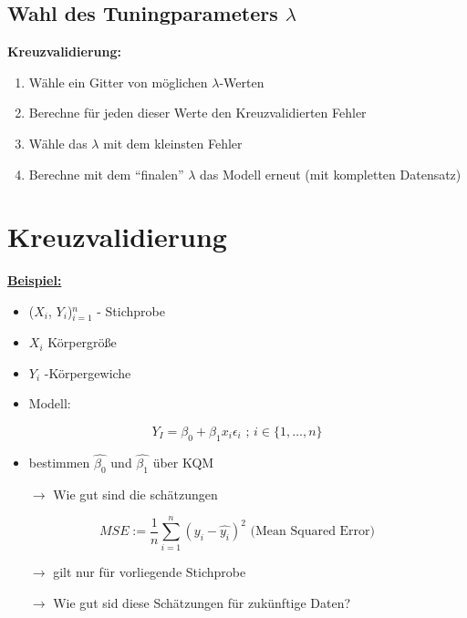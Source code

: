 
\subsection{Wahl des Tuningparameters $\lambda$}
\textbf{Kreuzvalidierung:}
\begin{enumerate}
	\item Wähle ein Gitter von möglichen $\lambda$-Werten
	\item Berechne für jeden dieser Werte den Kreuzvalidierten Fehler
	\item Wähle das \(\lambda\) mit dem kleinsten Fehler
	\item Berechne mit dem "`finalen"' \( \lambda \) das Modell erneut (mit kompletten Datensatz)
\end{enumerate}


\section{Kreuzvalidierung}
\textbf{\underline{Beispiel:}}
	\begin{itemize}
		\item ($X_i$, $Y_i$)$_{i=1}^n$ - Stichprobe
		\item $X_i$ Körpergröße
		\item $Y_i$ -Körpergewiche
		\item Modell: 
	\end{itemize}
		\[Y_I = \beta_0 + \beta_1 x_i\epsilon_i \text{ ; } i \in \{1, \ldots,n\}\]
\begin{itemize}
\item bestimmen $\hat{\beta_0}$ und $\hat{\beta_1}$ über KQM
\item [\(\rightarrow\)] Wie gut sind die schätzungen
\end{itemize}


\[ MSE := \frac{1}{n} \sum_{i = 1}^{n} (y_i - \hat{y_i})^2 \text{  (Mean Squared Error)}\]

\begin{itemize}
	\item[\( \rightarrow \)] gilt nur für vorliegende Stichprobe
	\item[\( \rightarrow \)] Wie gut sid diese Schätzungen für zukünftige Daten?
\end{itemize}

